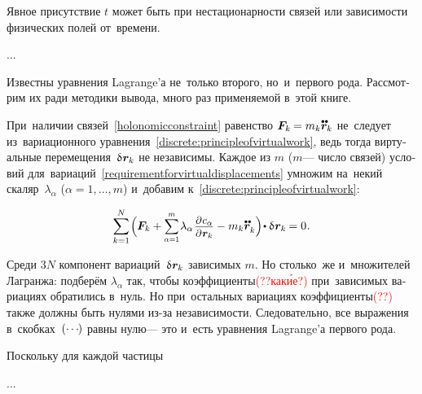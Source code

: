 \begin{otherlanguage}{russian}
\vspace{-0.15em}\noindent
Явное присутствие $t$ может быть при нестационарности связей или зависимости физических полей от~времени.

...

Известны уравнения Lagrange’а не~только второго, но~и~первого рода.
Рассмотрим их ради методики вывода, много раз применяемой в~этой книге.

При~наличии связей~\eqref{holonomicconstraint} равенство ${\bm{F}_k \hspace{-0.12ex} = m_k \mathdotdotabove{\locationvector}_k}$ не~следует из~вариационного уравнения~\eqref{discrete:principleofvirtualwork}, ведь тогда виртуальные перемещения~${\variation{\hspace{.1ex}\locationvector_k}}$ не независимы.
Каждое из $m$ ($m$\:--- число связей) условий для~вариаций~\eqref{requirementforvirtualdisplacements} умножим на~некий скаляр~$\lambda_{\alpha}$ (${\alpha = 1, \ldots, m}$) и~добавим к~\eqref{discrete:principleofvirtualwork}:

\nopagebreak\vspace{-0.2em}\begin{equation}
\displaystyle \sum_{k=1}^{N} \hspace{-0.2ex} \left(^{\mathstrut} \hspace{-0.16ex} \bm{F}_k \right. \hspace{-0.32ex} + \hspace{-0.05ex}
\scalebox{0.88}[0.92]{$ \displaystyle \sum_{\alpha=1}^{m} $} \hspace{.16ex} \lambda_{\alpha} \hspace{.2ex} \scalebox{0.92}{$\displaystyle \frac{\raisemath{-0.12em}{\partial \hspace{.1ex} c_{\alpha}}}{\partial \hspace{.1ex} \locationvector_k}$}
- \left. \hspace{-0.25ex} m_k \mathdotdotabove{\locationvector}_k ^{\mathstrut}\right) \hspace{-0.32ex} \dotp \variation{\hspace{.1ex}\locationvector_k} \hspace{-0.16ex} = 0
\hspace{.1ex} .
\end{equation}

\vspace{-0.1em} \noindent Среди $3N$ компонент вариаций~${\variation{\hspace{.1ex}\locationvector_k}}$ зависимых $m$.
Но столько~же и~множителей Лагранжа: подберём $\lambda_{\alpha}$ так, чтобы коэффициенты\textcolor{red}{(??как\'{и}е?)} при~зависимых вариациях обратились в~нуль.
Но при~остальных вариациях коэффициенты\textcolor{red}{(??)} также должны быть нулями из\hbox{-}за независимости.
Следовательно, все выражения в~скобках~${(\cdots\hspace{-0.2ex})}$ равны нулю\:--- это и~есть уравнения Lagrange’а первого рода.

Поскольку для каждой частицы

...



\end{otherlanguage}

